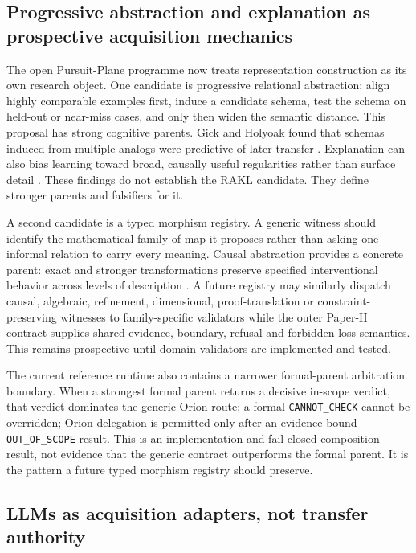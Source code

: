 \subsection{Progressive abstraction and explanation as prospective acquisition mechanics}

The open Pursuit-Plane programme now treats representation construction as its own research object. One candidate is progressive relational abstraction: align highly comparable examples first, induce a candidate schema, test the schema on held-out or near-miss cases, and only then widen the semantic distance. This proposal has strong cognitive parents. Gick and Holyoak found that schemas induced from multiple analogs were predictive of later transfer \cite{gick1983schema}. Explanation can also bias learning toward broad, causally useful regularities rather than surface detail \cite{williams2010explanation,walker2014explanation,legare2014explanation}. These findings do not establish the RAKL candidate. They define stronger parents and falsifiers for it.

A second candidate is a typed morphism registry. A generic witness should identify the mathematical family of map it proposes rather than asking one informal relation to carry every meaning. Causal abstraction provides a concrete parent: exact and stronger transformations preserve specified interventional behavior across levels of description \cite{rubenstein2017causal,beckers2019abstracting}. A future registry may similarly dispatch causal, algebraic, refinement, dimensional, proof-translation or constraint-preserving witnesses to family-specific validators while the outer Paper-II contract supplies shared evidence, boundary, refusal and forbidden-loss semantics. This remains prospective until domain validators are implemented and tested.

The current reference runtime also contains a narrower formal-parent arbitration boundary. When a strongest formal parent returns a decisive in-scope verdict, that verdict dominates the generic Orion route; a formal \texttt{CANNOT\_CHECK} cannot be overridden; Orion delegation is permitted only after an evidence-bound \texttt{OUT\_OF\_SCOPE} result. This is an implementation and fail-closed-composition result, not evidence that the generic contract outperforms the formal parent. It is the pattern a future typed morphism registry should preserve.

\subsection{LLMs as acquisition adapters, not transfer authority}

